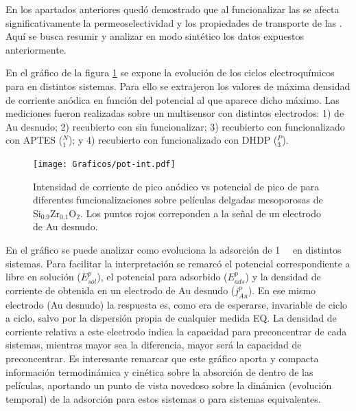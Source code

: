 	 	 En los apartados anteriores quedó demostrado que al funcionalizar las \pdmZ\space se afecta significativamente la permeoselectividad y los propiedades de transporte de las \pdm. Aquí se busca resumir y analizar en modo sintético los datos expuestos anteriormente. 

	 	 En el gráfico de la figura \ref{fig:pot-int} se expone la evolución de los ciclos electroquímicos para \ru\space en distintos sistemas. Para ello se extrajeron los valores de máxima densidad de corriente anódica en función del potencial al que aparece dicho máximo. Las mediciones fueron realizadas sobre un multisensor con distintos electrodos: 1) de Au desnudo; 2) recubierto con \pdmZ\space sin funcionalizar; 3) recubierto con \pdmZ\space funcionalizado con APTES (\pdmZ$^N_1$); y 4) recubierto con \pdmZ\space funcionalizado con DHDP (\pdmZ$^P_3$).

	 			 \begin{figure}[th!]	
					\centering
			 	    \texttt{[image: Graficos/pot-int.pdf]}
			        \caption[Evolución de la señal de \ru\space para distintos sistemas]{Intensidad de corriente de pico anódico vs potencial de pico de \aminorutenio\space para diferentes funcionalizaciones sobre películas delgadas mesoporosas de Si$_{0.9}$Zr$_{0.1}$O$_2$. Los puntos rojos correponden a la señal de un electrodo de Au desnudo.}
			        \label{fig:pot-int}
			        \vspace*{3mm}
			      	\end{figure}

	 	 \pagebreak En el gráfico se puede analizar como evoluciona la adsorción de \ru\space \SI{1}{\milli\Molar} en distintos sistemas. Para facilitar la interpretación se remarcó el potencial correspondiente a \ru\space libre en solución ($E^p_{sol}$), el potencial para \ru\space adsorbido ($E^p_{ads}$) y la densidad de corriente de \ru\space obtenida en un electrodo de Au desnudo ($j^p_{Au}$). En ese mismo electrodo (Au desnudo) la respuesta es, como era de esperarse, invariable de ciclo a ciclo, salvo por la dispersión propia de cualquier medida EQ. La densidad de corriente relativa a este electrodo indica la capacidad para preconcentrar de cada sistemas, mientras mayor sea la diferencia, mayor será la capacidad de preconcentrar. Es interesante remarcar que este gráfico aporta y compacta información termodinámica y cinética sobre la absorción de \ru\space dentro de las películas, aportando un punto de vista novedoso sobre la dinámica (evolución temporal) de la adsorción para estos sistemas o para sistemas equivalentes.

